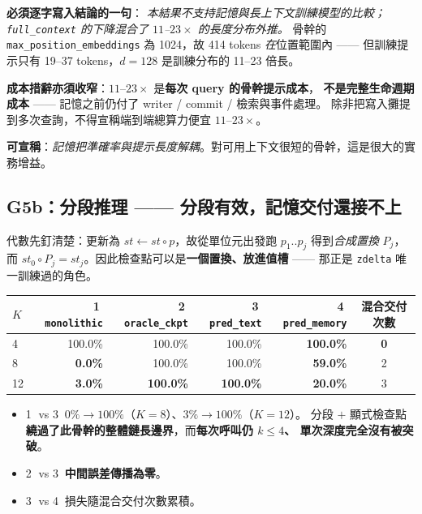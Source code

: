 \documentclass[11pt, a4paper]{article}
\begin{document}
\textbf{必須逐字寫入結論的一句}：
\emph{本結果不支持記憶與長上下文訓練模型的比較；\texttt{full\_context} 的下降混合了
$11$--$23\times$ 的長度分布外推。}
骨幹的 \verb|max_position_embeddings| 為 1024，故 414 tokens \emph{在}位置範圍內 ——
但訓練提示只有 19--37 tokens，$d{=}128$ 是訓練分布的 11--23 倍長。

\textbf{成本措辭亦須收窄}：$11$--$23\times$ 是\textbf{每次 query 的骨幹提示成本}，
\textbf{不是完整生命週期成本} —— 記憶之前仍付了 writer / commit / 檢索與事件處理。
除非把寫入攤提到多次查詢，不得宣稱端到端總算力便宜 $11$--$23\times$。

\textbf{可宣稱}：\emph{記憶把準確率與提示長度解耦}。對可用上下文很短的骨幹，這是很大的實務增益。

\subsection{G5b：分段推理 —— 分段有效，記憶交付還接不上}

代數先釘清楚：更新為 $st \leftarrow st \circ p$，故從單位元出發跑 $p_1..p_j$ 得到\emph{合成置換}
$P_j$，而 $st_0 \circ P_j = st_j$。因此檢查點可以是\textbf{一個置換、放進值槽} ——
那正是 \verb|zdelta| 唯一訓練過的角色。

\begin{table}[h]
\centering
\small
\begin{tabular}{lrrrrc}
\toprule
$K$ & \textcircled{1} \verb|monolithic| & \textcircled{2} \verb|oracle_ckpt| & \textcircled{3} \verb|pred_text| & \textcircled{4} \verb|pred_memory| & 混合交付次數 \\
\midrule
4 & 100.0\% & 100.0\% & 100.0\% & \textbf{100.0\%} & \textbf{0} \\
8 & \textbf{0.0\%} & 100.0\% & 100.0\% & \textbf{59.0\%} & 2 \\
12 & \textbf{3.0\%} & \textbf{100.0\%} & \textbf{100.0\%} & \textbf{20.0\%} & 3 \\
\bottomrule
\end{tabular}
\end{table}

\begin{itemize}
  \item \textcircled{1} vs \textcircled{3}：$0\% \to 100\%$（$K{=}8$）、$3\% \to 100\%$（$K{=}12$）。
        分段 $+$ 顯式檢查點\textbf{繞過了此骨幹的整體鏈長邊界}，而\textbf{每次呼叫仍 $k \leq 4$、
        單次深度完全沒有被突破}。
  \item \textcircled{2} vs \textcircled{3}：\textbf{中間誤差傳播為零}。
  \item \textcircled{3} vs \textcircled{4}：損失隨混合交付次數累積。
\end{itemize}
\end{document}

